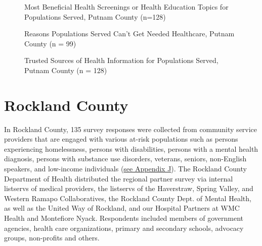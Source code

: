 \documentclass[
  english,
  letterpaper,
]{report}
\begin{document}
\begin{figure}


\caption{\label{fig-pc-help-hlth-screen-education}Most Beneficial Health
Screenings or Health Education Topics for Populations Served, Putnam
County (n=128)}

\end{figure}%

\begin{figure}


\caption{\label{fig-pc-reason-no-hlthcare}Reasons Populations Served
Can't Get Needed Healthcare, Putnam County (n = 99)}

\end{figure}%

\begin{figure}


\caption{\label{fig-pc-trust-hlth-source}Trusted Sources of Health
Information for Populations Served, Putnam County (n = 128)}

\end{figure}%

\section{Rockland County}\label{rockland-county-2}

In Rockland County, 135 survey responses were collected from community
service providers that are engaged with various at-risk populations such
as persons experiencing homelessness, persons with disabilities, persons
with a mental health diagnosis, persons with substance use disorders,
veterans, seniors, non-English speakers, and low-income individuals
(\hyperref[sec-appendix-j-community-partner-survey-references]{see
Appendix J}). The Rockland County Department of Health distributed the
regional partner survey via internal listservs of medical providers, the
listservs of the Haverstraw, Spring Valley, and Western Ramapo
Collaboratives, the Rockland County Dept. of Mental Health, as well as
the United Way of Rockland, and our Hospital Partners at WMC Health and
Montefiore Nyack. Respondents included members of government agencies,
health care organizations, primary and secondary schools, advocacy
groups, non-profits and others.
\end{document}
